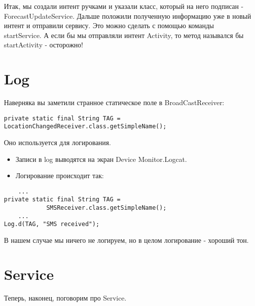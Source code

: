 \documentclass[12 pt]{article}
\begin{document}
    Итак, мы создали интент ручками и указали класс, который на него подписан - ForecastUpdateService. Дальше положили полученную информацию уже в новый интент и отправили сервису. Это можно сделать с помощью команды startService. А если бы мы отправляли интент Activity, то метод назывался бы startActivity - осторожно!
            
\section{Log}     
    Наверняка вы заметили странное статическое поле в BroadCastReceiver: 
    \begin{lstlisting}
private static final String TAG = LocationChangedReceiver.class.getSimpleName();
    \end{lstlisting}
    
    Оно используется для логирования.
    
    \begin{itemize}
        \item Записи в log выводятся на экран Device Monitor.Logcat.
        \item Логирование происходит так:
    \end{itemize}
    \begin{lstlisting}
    ...
private static final String TAG = 
            SMSReceiver.class.getSimpleName();
    ...
Log.d(TAG, "SMS received");    
    \end{lstlisting}

    В нашем случае мы ничего не логируем, но в целом логирование - хороший тон.
    
    \section{Service}    
    Теперь, наконец, поговорим про Service.
    
\end{document}
